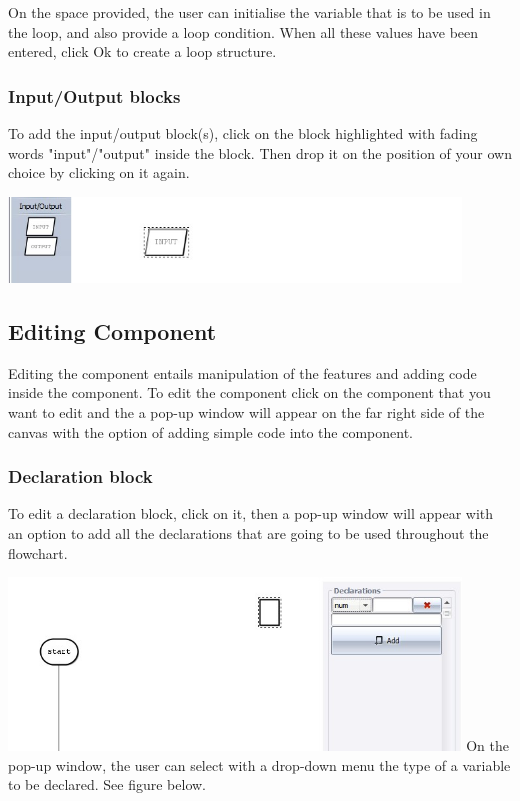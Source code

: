 \documentclass[11pt,a4paper,titlepage]{article}
\begin{document}
	On the space provided, the user can initialise the variable that is to be used in the loop, and also provide a loop condition. When all these values have been entered, click Ok to create a loop structure.
	
	\subsubsection{Input/Output blocks}	
	
	To add the input/output block(s), click on the block highlighted with fading words "input"/"output" inside the block. Then drop it on the position of your own choice by clicking on it again.\newline \newline
	
	\includegraphics[width=12cm]{images/io.jpg} \newline
	
	\subsection{Editing Component}
	
	Editing the component entails manipulation of the features and adding code inside the component. To edit the component click on the component that you want to edit and the a pop-up window will appear on the far right side of the canvas with the option of adding simple code into the component. 
	
	\subsubsection{Declaration block}
	
	To edit a declaration block, click on it, then a pop-up window will appear with an option to add all the declarations that are going to be used throughout the flowchart.\newline \newline
	
	\includegraphics[width=12cm]{images/editDeclaration.jpg} \newline \newline
	On the pop-up window, the user can select with a drop-down menu the type of a variable to be declared. See figure below.\newline \newline
	
\end{document}
